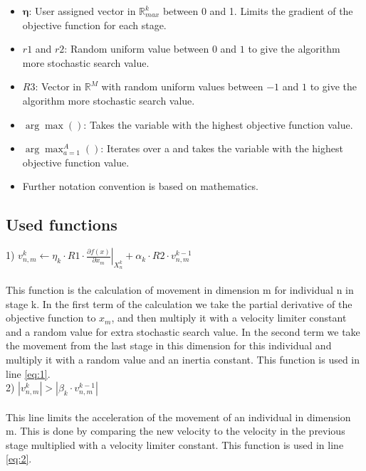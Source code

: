 \documentclass[runningheads]{llncs}
\begin{document}
\begin{itemize}
    \item $\boldsymbol{\eta}$: User assigned vector in $\mathds{R}^k_{max}$ between 0 and 1. Limits the gradient of the objective function for each stage.
    \item $ r1 $ and $r2 $: Random uniform value between $ 0 $ and $ 1$ to give the algorithm more stochastic search value.
    \item $ R3 $: Vector in $\mathds{R}^M$ with random uniform values between $ -1 $ and $ 1$ to give the algorithm more stochastic search value.
    \item $\arg \max() $: Takes the variable with the highest objective function value.
    \item $\arg \max_{a=1}^A()$: Iterates over a and takes the variable with the highest objective function value.
    \item Further notation convention is based on mathematics.
\end{itemize}

\subsection{Used functions}

1) $
v_{n,m}^k \leftarrow \eta _k \cdot R1 \cdot  \left. \frac{\partial f(x)}{\partial x_m} \right \rvert_{X_{n}^k} + \alpha_k \cdot R2 \cdot v_{n,m}^{k-1}
$ \\ \\
This function is the calculation of movement in dimension m for individual n in stage k. In the first term of the calculation we take the partial derivative of the objective function to $x_m$, and then multiply it with a velocity limiter constant and a random value for extra stochastic search value. In the second term we take the movement from the last stage in this dimension for this individual and multiply it with a random value and an inertia constant. This function is used in line \ref{eq:1}. \\ 

2) $
\left \lvert v_{n,m}^k \right \rvert  > \left \lvert \beta_k \cdot v_{n,m}^{k-1} \right \rvert
$ \\ \\
This line limits the acceleration of the movement of an individual in dimension m. This is done by comparing the new velocity to the velocity in the previous stage multiplied with a velocity limiter constant. This function is used in line \ref{eq:2}. \\ 
\end{document}
